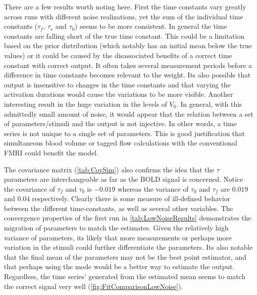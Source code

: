 There are a few results worth noting here. First the time constants vary greatly across
runs with different noise realizations, yet the sum of the individual time constants
($\tau_f$, $\tau_s$ and $\tau_0$) seems to be more consistent. In general the 
time constants are falling short of the true time constant. This could be a limitation
based on the prior distribution (which notably has an initial mean below the true values) 
or it could be caused by the disassociated benefits of a correct time
constant with correct output. It often takes several measurement periods before a difference
in time constants becomes relevant to the weight. Its also possible that output is insensitive
to changes in the time constants and that varying the activation durations would 
cause the variations to be more visible. Another interesting result in the huge variation 
in the levels of $V_0$. In general,
with this admittedly small amount of noise, it would appear that the relation between a set
of parameters/stimuli and the output is not injective. In other words,  a time
series is not unique to a single set of parameters. This is good justification that 
simultaneous blood volume or tagged flow calculations with the conventional FMRI 
could benefit the model. 

The covariance matrix (\autoref{tab:CovSim}) also confirms the idea that the 
$\tau$ parameters are interchangeable
as far as the BOLD signal is concerned. Notice the covariance of $\tau_f$ and $\tau_0$
is $-0.019$ whereas
the variance of $\tau_0$ and $\tau_f$ are $0.019$ and $0.04$ respectively. Clearly there is 
some measure of ill-defined behavior between the different time-constants, as well as several
other variables.  The convergence properties of the first run in \autoref{tab:LowNoiseResults} 
demonstrates the migration of parameters to match the estimates. Given the relatively high
variance of parameters, its likely that more measurements or perhaps more variation
in the stimuli could further differentiate the parameters. Its also notable that
the final mean of the parameters may not be the best point estimator, and that perhaps
using the mode would be a better way to estimate the output. Regardless, the time series'
generated from the estimated mean seems to match the correct signal very well 
(\autoref{fig:FitComparisonLowNoise}).

